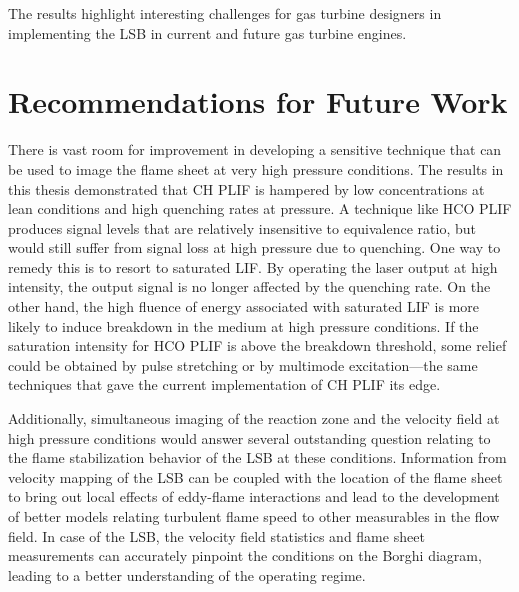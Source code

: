 The results highlight interesting challenges for gas turbine designers in implementing the LSB in current and future gas turbine engines. 

\section{Recommendations for Future Work}

There is vast room for improvement in developing a sensitive technique that can be used to image the flame sheet at very high pressure conditions.
The results in this thesis demonstrated that CH PLIF is hampered by low concentrations at lean conditions and high quenching rates at pressure.
A technique like HCO PLIF produces signal levels that are relatively insensitive to equivalence ratio, but would still suffer from signal loss at high pressure due to quenching.
One way to remedy this is to resort to saturated LIF.
By operating the laser output at high intensity, the output signal is no longer affected by the quenching rate.
On the other hand, the high fluence of energy associated with saturated LIF is more likely to induce breakdown in the medium at high pressure conditions.
If the saturation intensity for HCO PLIF is above the breakdown threshold, some relief could be obtained by pulse stretching or by multimode excitation---the same techniques that gave the current implementation of CH PLIF its edge.

Additionally, simultaneous imaging of the reaction zone and the velocity field at high pressure conditions would answer several outstanding question relating to the flame stabilization behavior of the LSB at these conditions.
Information from velocity mapping of the LSB can be coupled with the location of the flame sheet to bring out local effects of eddy-flame interactions and lead to the development of better models relating turbulent flame speed to other measurables in the flow field.
In case of the LSB, the velocity field statistics and flame sheet measurements can accurately pinpoint the conditions on the Borghi diagram, leading to a better understanding of the operating regime.


